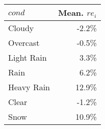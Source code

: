 \begin{tabular}{lr}
 $\mathit{cond}$ & Mean. $\mathit{re}_i$ \\ 
  \hline
\hline
Cloudy & -2.2\% \\ 
   \hline
Overcast & -0.5\% \\ 
   \hline
Light Rain & 3.3\% \\ 
   \hline
Rain & 6.2\% \\ 
   \hline
Heavy Rain & 12.9\% \\ 
   \hline
Clear & -1.2\% \\ 
   \hline
Snow & 10.9\% \\ 
   \hline
\end{tabular}
